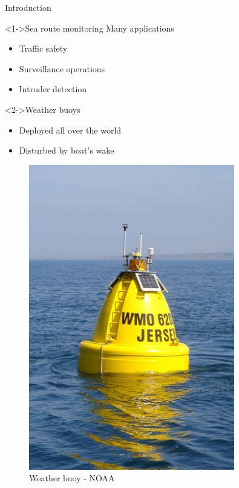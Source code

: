 \documentclass{beamer}
\begin{document}
        \begin{frame}{Introduction}
            \begin{minipage}[b]{0.55\textwidth}
                \begin{block}<1->{Sea route monitoring}
                    Many applications
                    \begin{itemize}
                        \item Traffic safety
                        \item Surveillance operations
                        \item Intruder detection
                    \end{itemize}
                \end{block}
                \begin{block}<2->{Weather buoys}
                    \begin{itemize}
                        \item Deployed all over the world\footnotemark[1]
                        \item Disturbed by boat's wake
                    \end{itemize}
                \end{block}
            \end{minipage}
            \hfill
            \begin{minipage}[b]{0.4\textwidth}
                \begin{figure}
                    \includegraphics[width=0.8\textwidth, trim={0, 50, 0, 50}, clip]{imgs/buoy}
                    \caption{Weather buoy - NOAA\footnotemark[1]}
                \end{figure}
            \end{minipage}


\end{frame}
\end{document}
